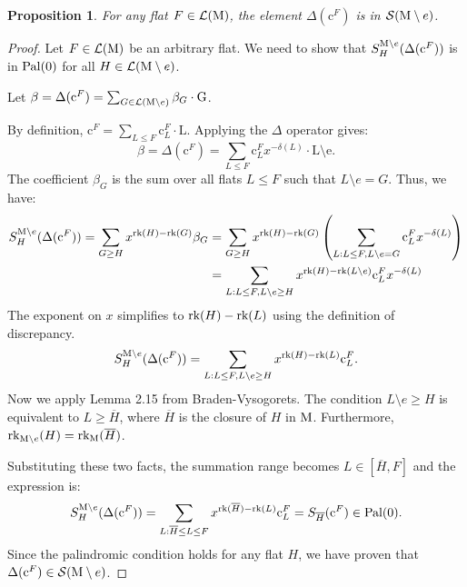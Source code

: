 \documentclass[11pt]{article}
\newcommand{\calL}{\mathcal{L}}
\newcommand{\calS}{\mathcal{S}}
\newcommand{\rank}{\normalfont\text{rk}}
\newcommand{\M}{\normalfont\text{M}}
\newcommand{\Ebasis}[1]{\mathrm{#1}}
\newcommand{\Cbasis}[1]{\mathrm{c}^{#1}}
\newcommand{\CbasisSub}[2]{\mathrm{c}^{#1}_{#2}}
\newcommand{\pal}{\normalfont\text{Pal}}
\newtheorem{proposition}[theorem]{Proposition}
\theoremstyle{remark}
\begin{document}
\begin{proposition}\label{prop:DeltaFInS}
    For any flat \(F \in \mathcal{L}(\M)\), the element \(\Delta(\Cbasis{F})\) is in \(\calS(\M \setminus e)\).
\end{proposition}
\begin{proof}
    Let \(F \in \mathcal{L}(\M)\) be an arbitrary flat. We need to show that
    \(S_H^{\M\setminus e}(\Delta(\Cbasis{F}))\) is in \(\pal(0)\) for all \(H \in \calL(\M \setminus e)\).

    Let \(\beta = \Delta(\Cbasis{F}) = \sum_{G \in \calL(\M \setminus e)} \beta_G \cdot \Ebasis{G}\).

    By definition, \(\Cbasis{F} = \sum_{L \le F} \CbasisSub{F}{L} \cdot \Ebasis{L}\). Applying the \(\Delta\) operator gives:
    \[ \beta = \Delta(\Cbasis{F}) = \sum_{L \le F} \CbasisSub{F}{L} x^{-\delta(L)}\cdot \Ebasis{L \setminus e}. \]
    The coefficient \(\beta_G\) is the sum over all flats \(L \le F\) such that \(L \setminus e = G\).
    Thus, we have:
    \begin{align*}
        S_H^{\M\setminus e}(\Delta(\Cbasis{F})) = \sum_{G \ge H} x^{\rank(H)-\rank(G)} \beta_G
         & = \sum_{G \ge H} x^{\rank(H)-\rank(G)} \left( \sum_{L: L \le F, L\setminus e = G} \CbasisSub{F}{L} x^{-\delta(L)} \right) \\
         & = \sum_{L: L \le F, L\setminus e \ge H} x^{\rank(H)-\rank(L \setminus e)} \CbasisSub{F}{L} x^{-\delta(L)}
    \end{align*}
    The exponent on \(x\) simplifies  to \( \rank(H) - \rank(L) \) using the definition of discrepancy.
    \[ S_H^{\M\setminus e}(\Delta(\Cbasis{F})) = \sum_{L: L \le F, L\setminus e \ge H} x^{\rank(H)-\rank(L)}
        \CbasisSub{F}{L}. \]
    Now we apply Lemma 2.15 from Braden-Vysogorets.
    The condition \(L\setminus e \ge H\) is equivalent to \(L \ge \overline{H}\), where \(\overline{H}\)
    is the closure of \(H\) in \(\M\). Furthermore, \(\rank_{\M\setminus e}(H) = \rank_{\M}(\overline{H})\).

    Substituting these two facts, the summation range becomes \(L \in [\overline{H}, F]\) and the expression is:
    \[ S_H^{\M\setminus e}(\Delta(\Cbasis{F})) = \sum_{L: \overline{H} \le L \le F} x^{\rank(\overline{H})-\rank(L)} \CbasisSub{F}{L}
        = S_{\overline{H}}(\Cbasis{F})\in \pal(0). \]
    Since the palindromic condition holds for any flat \(H\), we have proven that
    \(\Delta(\Cbasis{F}) \in \calS(\M \setminus e)\).
\end{proof}
\end{document}
